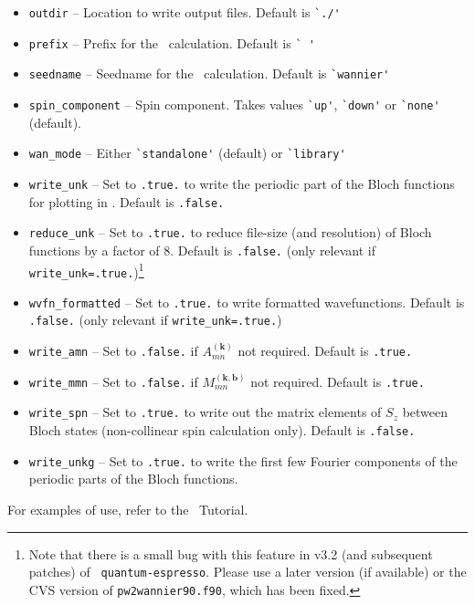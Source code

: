 \begin{itemize}

\item   \verb#outdir# -- Location to write output files. Default is \verb#`./'#

\item   \verb#prefix# -- Prefix for the \pwscf\ calculation. Default is \verb#` '#

\item   \verb#seedname# -- Seedname for the \wannier\ calculation. Default
   is \verb#`wannier'#

\item   \verb#spin_component# -- Spin component. Takes values \verb#`up'#,
   \verb#`down'# or \verb#`none'# (default).

\item   \verb#wan_mode# -- Either \verb#`standalone'# (default) or \verb#`library'#

\item   \verb#write_unk# -- Set to \verb#.true.# to write the periodic part
   of the Bloch functions for plotting in \wannier. Default is
   \verb#.false.#

\item   \verb#reduce_unk# -- Set to \verb#.true.# to reduce file-size (and
   resolution) of Bloch functions by a factor of 8. Default is
   \verb#.false.# (only relevant if
   \verb#write_unk=.true.#)\footnote{Note that there is a small bug
   with this feature in v3.2 (and subsequent patches) of {\tt
   quantum-espresso}. Please use a later version (if available) or the
   CVS version of {\tt pw2wannier90.f90}, which has been fixed.}

\item   \verb#wvfn_formatted# -- Set to \verb#.true.# to write formatted
   wavefunctions. Default is \verb#.false.# (only relevant if
   \verb#write_unk=.true.#)

\item   \verb#write_amn# -- Set to \verb#.false.# if
   $A_{mn}^{(\mathbf{k})}$ not required. Default is \verb#.true.#

\item   \verb#write_mmn# -- Set to \verb#.false.# if
   $M_{mn}^{(\mathbf{k,b})}$ not required. Default is \verb#.true.#

\item   \verb#write_spn# -- Set to \verb#.true.# to write out the matrix
   elements of $S_z$ between Bloch states (non-collinear spin calculation
   only). Default is \verb#.false.#

\item   \verb#write_unkg# -- Set to \verb#.true.# to write the first few
   Fourier components of the periodic parts of the Bloch functions.

\end{itemize}

For examples of use, refer to the \wannier\ Tutorial.
